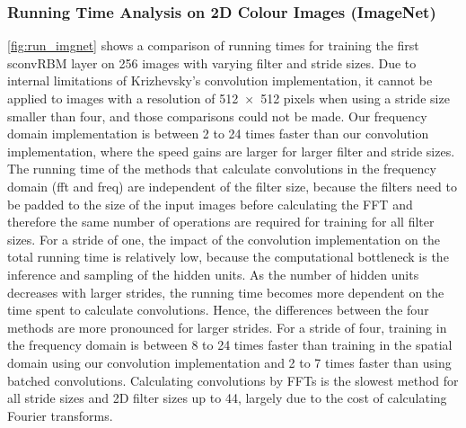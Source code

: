 \subsubsection[Running time analysis on 2D colour images (ImageNet)]{Running
Time Analysis on 2D Colour Images (ImageNet)}

\ref{fig:run_imgnet} shows a comparison of running
times for training the first sconvRBM layer on 256 images with varying filter
and stride sizes. Due to internal limitations of Krizhevsky's convolution
implementation, it cannot be applied to images with a resolution of
\num{512x512} pixels when using a stride size smaller than four, and those
comparisons could not be made. Our frequency domain implementation is between 2
to 24 times faster than our convolution implementation, where the speed gains
are larger for larger filter and stride sizes. The running time of the methods
that calculate convolutions in the frequency domain (fft and freq) are
independent of the filter size, because the filters need to be padded to the
size of the input images before calculating the FFT and therefore the same
number of operations are required for training for all filter sizes. For a
stride of one, the impact of the convolution implementation on the total running
time is relatively low, because the computational bottleneck is the inference
and sampling of the hidden units.
As the number of hidden units decreases with larger strides, the running time
becomes more dependent on the time spent to calculate convolutions.
Hence, the differences between the four methods are more pronounced for larger
strides. For a stride of four, training in the frequency domain is between 8 to
24 times faster than training in the spatial domain using our convolution
implementation and 2 to 7 times faster than using batched convolutions.
Calculating convolutions by FFTs is the slowest method for all stride sizes and
2D filter sizes up to 44, largely due to the cost of calculating Fourier
transforms.

